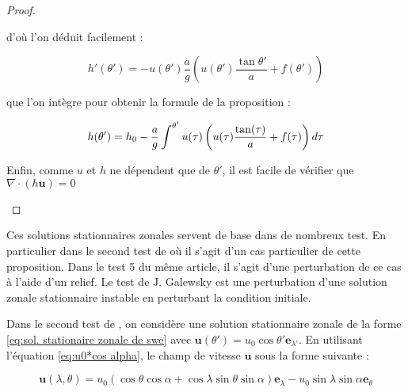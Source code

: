 \begin{proof}
\begin{itemize}
d'où l'on déduit facilement :

\begin{equation}
h'(\theta') = - u(\theta') \dfrac{a}{g} \left( u(\theta') \dfrac{\tan \theta'}{a} + f(\theta') \right)
\end{equation}

que l'on intègre pour obtenir la formule de la proposition :

\begin{equation}
h(\theta') = h_0 - \dfrac{a}{g} \displaystyle\int^{\theta'} u(\tau) \left( u(\tau) \dfrac{\tan (\tau)}{a} + f(\tau) \right) d\tau
\end{equation}

Enfin, comme $u$ et $h$ ne dépendent que de $\theta'$, il est facile de vérifier que $\nabla \cdot \left( h \mathbf{u} \right)=0$
\end{itemize}
\end{proof}

Ces solutions stationnaires zonales servent de base dans de nombreux test. En particulier dans le second test de \cite{Williamson1992} où il s'agit d'un cas particulier de cette proposition. Dans le test 5 du même article, il s'agit d'une perturbation de ce cas à l'aide d'un relief.
Le test de J. Galewsky \cite{Galewsky2004} est une perturbation d'une solution zonale stationnaire instable en perturbant la condition initiale.





















Dans le second test de \cite{Williamson1992}, on considère une solution stationnaire zonale de la forme \eqref{eq:sol. stationaire zonale de swe} avec $\mathbf{u}(\theta')=u_0 \cos \theta' \mathbf{e}_{\lambda'}$. En utilisant l'équation \eqref{eq:u0*cos alpha}, le champ de vitesse $\mathbf{u}$ sous la forme suivante :

\begin{equation}
\mathbf{u}(\lambda, \theta) = u_0 \left( \cos \theta \cos \alpha + \cos \lambda \sin \theta \sin \alpha \right) \mathbf{e}_{\lambda} - u_0 \sin \lambda \sin \alpha \mathbf{e}_{\theta}
\label{eq: williamson 2 initial velocity}
\end{equation} 

